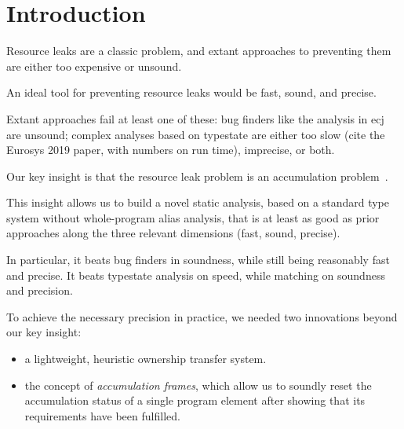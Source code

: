 \section{Introduction}
\label{sec:intro}

Resource leaks are a classic problem, and extant approaches to preventing
them are either too expensive or unsound.

An ideal tool for preventing resource leaks would be fast, sound, and precise.

Extant approaches fail at least one of these: bug finders like the analysis
in ecj are unsound; complex analyses based on typestate are either too slow
(cite the Eurosys 2019 paper, with numbers on run time), imprecise, or both.

Our key insight is that the resource leak problem is an accumulation
problem~\cite{kellogg20verifying}.

This insight allows us to build a novel static analysis, based on a standard
type system without whole-program alias analysis, that is at least as good
as prior approaches along the three relevant dimensions (fast, sound, precise).

In particular, it beats bug finders in soundness, while still being reasonably
fast and precise. It beats typestate analysis on speed, while matching on
soundness and precision.

To achieve the necessary precision in practice, we needed two innovations
beyond our key insight:
\begin{itemize}
\item a lightweight, heuristic ownership transfer system.
\item the concept of \emph{accumulation frames}, which allow us to
  soundly reset the accumulation status of a single program element
  after showing that its requirements have been fulfilled. 
\end{itemize}

